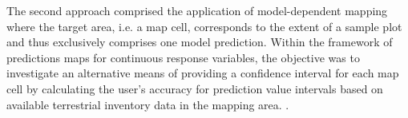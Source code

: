 The second approach comprised the application of model-dependent mapping where the target area, i.e. a map cell, corresponds to the extent of a sample plot and thus exclusively comprises one model prediction. Within the framework of predictions maps for continuous response variables, the objective was to investigate an alternative means of providing a confidence interval for each map cell by calculating the user's accuracy for prediction value intervals based on available terrestrial inventory data in the mapping area.
. 










